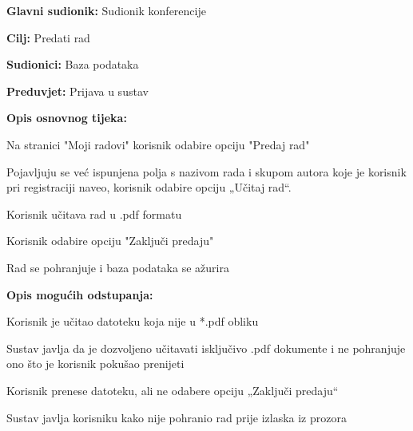 					\noindent {}
					\begin{packed_item}
	
						\item \textbf{Glavni sudionik: } Sudionik konferencije
						\item  \textbf{Cilj:} Predati rad
						\item  \textbf{Sudionici:} Baza podataka
						\item  \textbf{Preduvjet:} Prijava u sustav
						\item  \textbf{Opis osnovnog tijeka:}
						
						\item[] \begin{packed_enum}
	
							\item Na stranici "Moji radovi" korisnik odabire opciju "Predaj rad"
							\item Pojavljuju se već ispunjena polja s nazivom rada i skupom autora koje je korisnik pri registraciji naveo, korisnik odabire opciju „Učitaj rad“.
							\item Korisnik učitava rad u .pdf formatu
							\item Korisnik odabire opciju "Zaključi predaju"
							\item Rad se pohranjuje i baza podataka se ažurira

					
						\end{packed_enum}

						\item  \textbf{Opis mogućih odstupanja:}
						
						\item[] \begin{packed_item}
	
							\item[3.a]  Korisnik je učitao datoteku koja nije u *.pdf obliku
							\item[] \begin{packed_enum}
								
								\item Sustav javlja da je dozvoljeno učitavati isključivo .pdf dokumente i ne pohranjuje ono što je korisnik pokušao prenijeti
								
							\end{packed_enum}

							\item[3.b]  Korisnik prenese datoteku, ali ne odabere opciju „Zaključi predaju“
							\item[] \begin{packed_enum}
								
								\item Sustav javlja korisniku kako nije pohranio rad prije izlaska iz prozora
								
							\end{packed_enum}
							
						\end{packed_item}
			
					\end{packed_item}

